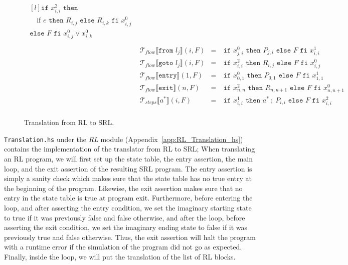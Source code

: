 \begin{figure}
$$\begin{aligned}
      \begin{matrix*}[l]
        \texttt{if }x_{i,i}^2\texttt{ then}\\
        \quad\text{if }e\texttt{ then }R_{i,j}\texttt{ else }R_{i,k}\texttt{ fi }x_{i,j}^0\\
        \texttt{else }F\texttt{ fi }x_{i,j}^0\lor x_{i,k}^0\\
      \end{matrix*}\\
    & \mathcal{T}_{flow}\llbracket\texttt{from }l_j\rrbracket(i,F) & =\ & \texttt{if }x_{j,i}^0\texttt{ then }P_{j,i}\texttt{ else }F\texttt{ fi }x_{i,i}^1\\
    & \mathcal{T}_{flow}\llbracket\texttt{goto }l_j\rrbracket(i,F) & =\ & \texttt{if }x_{i,i}^2\texttt{ then }R_{i,j}\texttt{ else }F\texttt{ fi }x_{i,j}^0\\
    & \mathcal{T}_{flow}\llbracket\texttt{entry}\rrbracket(1,F)    & =\ & \texttt{if }x_{0,1}^0\texttt{ then }P_{0,1}\texttt{ else }F\texttt{ fi }x_{1,1}^1\\
    & \mathcal{T}_{flow}\llbracket\texttt{exit}\rrbracket(n,F)     & =\ & \texttt{if }x_{n,n}^2\texttt{ then }R_{n,n+1}\texttt{ else }F\texttt{ fi }x_{n,n+1}^0\\
    & \mathcal{T}_{steps}\llbracket a^*\rrbracket(i,F)     & =\ & \texttt{if }x_{i,i}^1\texttt{ then }a^*\ ;\ P_{i,i}\texttt{ else }F\texttt{ fi }x_{i,i}^2\\
  \end{aligned}$$
  \caption{Translation from RL to SRL.}
  \label{fig:translation_rl_to_srl}
\end{figure}
\texttt{Translation.hs} under the \textit{RL} module (Appendix~\ref{app:RL_Translation_hs}) contains the implementation of the translator from RL to SRL; When translating an RL program, we will first set up the state table, the entry assertion, the main loop, and the exit assertion of the resulting SRL program. The entry assertion is simply a sanity check which makes sure that the state table has no true entry at the beginning of the program. Likewise, the exit assertion makes sure that no entry in the state table is true at program exit. Furthermore, before entering the loop, and after asserting the entry condition, we set the imaginary starting state to true if it was previously false and false otherwise, and after the loop, before asserting the exit condition, we set the imaginary ending state to false if it was previously true and false otherwise. Thus, the exit assertion will halt the program with a runtime error if the simulation of the program did not go as expected. Finally, inside the loop, we will put the translation of the list of RL blocks.


